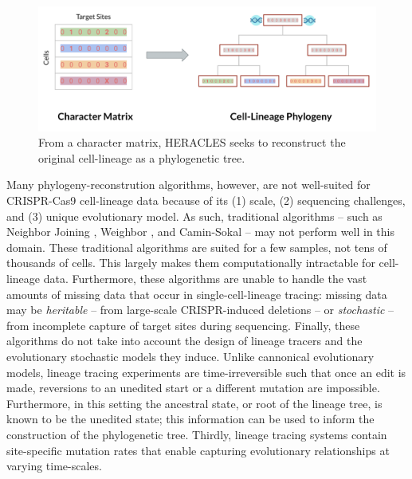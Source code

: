 \documentclass{article}
\begin{document}
\begin{figure}[t]
  \label{fig:problem_statement}
  \includegraphics[width=\linewidth]{images/problem_statement.png}
  \caption{From a character matrix, HERACLES seeks to reconstruct the original cell-lineage as a phylogenetic tree.}
\end{figure}

Many phylogeny-reconstrution algorithms, however, are not well-suited for CRISPR-Cas9 cell-lineage data because of its (1) scale, (2) sequencing challenges, and (3) unique evolutionary model. As such, traditional algorithms -- such as Neighbor Joining \cite{saitou1987neighbor}, Weighbor \cite{bruno2000}, and Camin-Sokal \cite{camin1965method} -- may not perform well in this domain. These traditional algorithms are suited for a few samples, not tens of thousands of cells. This largely makes them computationally intractable for cell-lineage data. Furthermore, these algorithms are unable to handle the vast amounts of missing data that occur in single-cell-lineage tracing: missing data may be \emph{heritable} -- from large-scale CRISPR-induced deletions -- or \emph{stochastic} -- from incomplete capture of target sites during sequencing. Finally, these algorithms do not take into account the design of lineage tracers and the evolutionary stochastic models they induce. Unlike cannonical evolutionary models, lineage tracing experiments are time-irreversible such that once an edit is made, reversions to an unedited start or a different mutation are impossible.  Furthermore, in this setting the ancestral state, or root of the lineage tree, is known to be the unedited state; this information can be used to inform the construction of the phylogenetic tree. Thirdly, lineage tracing systems contain site-specific mutation rates that enable capturing evolutionary relationships at varying time-scales.
\end{document}
